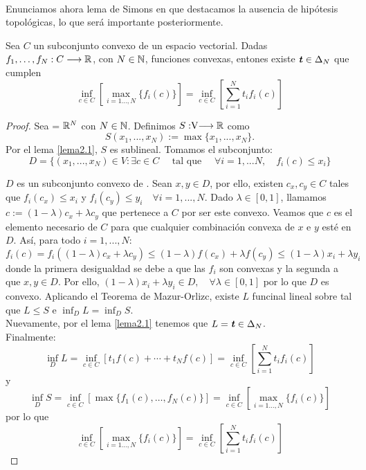 	\paragraph{} Enunciamos ahora lema de Simons\cite{Simons2008} en que destacamos la ausencia de hipótesis topológicas, lo que será importante posteriormente.
	
	\begin{lemaBox}\label{Simons}
		Sea $ C $ un subconjunto convexo de un espacio vectorial. Dadas $ f_1, \dots, f_N : C \longrightarrow \mathbb{R} $, con $ N \in \mathbb{N} $, funciones convexas, entones existe $ \textbf{\emph{t}} \in \Delta_N $ que cumplen
		\[
		\inf_{c \in C}\left[ \max_{i=1\dots,N } \{f_i(c)\}\right] = \inf_{c \in C} \left[ \sum_{i=1}^{N} t_i f_i(c) \right]
		\] 
	\end{lemaBox}
	\begin{proof}
		Sea  \vecSpace = $ \mathbb{R}^N $ con $ N \in \mathbb{N} $. Definimos $S:\vecSpace \longrightarrow \RR $ como \[ S(x_1, ..., x_N) := \max \{x_1, ..., x_N\}. \] Por el lema \ref{lema2.1}, $ S $ es sublineal. Tomamos el subconjunto:
		\[ 
		D = \{ (x_1, ..., x_N)\in V: \exists c \in C \quad \text{ tal que } \quad \forall i = 1,...N,\quad f_i(c) \leq x_i \}
		\]
		
		$ D $ es un subconjunto convexo de \vecSpace. Sean $ x, y \in D $, por ello, existen $ c_x, c_y \in C $ tales que $ f_i (c_x) \leq x_i  $ y $ f_i (c_y) \leq y_i \quad \forall i=1,...,N $. Dado $ \lambda \in [0,1] $, llamamos $ c := (1-\lambda)c_x + \lambda c_y $ que pertenece a $ C $ por ser este convexo. Veamos que $ c $ es el elemento necesario de $ C $ para que cualquier combinación convexa de $ x $ e $ y $ esté en $ D $. Así, para todo $ i =1,...,N  $:	
		\[
		f_i(c) = f_i((1-\lambda)c_x + \lambda c_y) \leq (1-\lambda)f(c_x) + \lambda f(c_y) \leq (1-\lambda)x_i + \lambda y_i 
		\]
		donde la primera desigualdad se debe a que las $ f_i $ son convexas y la segunda a que $ x,y \in D $. Por ello, $ (1-\lambda)x_i + \lambda y_i \in D , \quad \forall \lambda \in [0,1] $ por lo que $ D $ es convexo. Aplicando el Teorema de Mazur-Orlizc, existe $ L $ funcinal lineal sobre \vecSpace tal que $ L \leq S $ e $ \inf_D L = \inf_D S $. \\
		
		Nuevamente, por el lema \ref{lema2.1} tenemos que $ L = \textbf{\emph{t}} \in \Delta_N$. \\
		
		Finalmente:
		\[
		\inf_D L = \inf_{c\in C} \left[ t_1 f(c) + \cdots+ t_N f(c) \right] =\inf_{c \in C} \left[ \sum_{i=1}^{N} t_i f_i(c) \right]
		\]
		y
		\[
		\inf_D S = \inf_{c\in C} \left[ \max \{f_1(c), \dots, f_N(c)\} \right] = \inf_{c \in C}\left[ \max_{i=1\dots,N } \{f_i(c)\}\right]
		\]
		por lo que 
		\[ \inf_{c \in C}\left[ \max_{i=1\dots,N } \{f_i(c)\}\right] = \inf_{c \in C} \left[ \sum_{i=1}^{N} t_i f_i(c) \right] \] 
	\end{proof}

